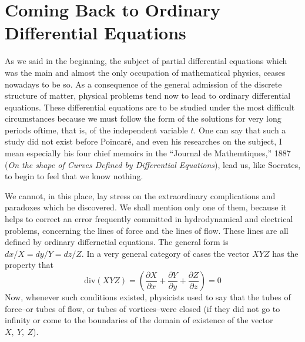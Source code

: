 \documentclass[12pt,oneside]{book}
\newcommand{\iit}[1]{\textit{#1}}
\begin{document}
\section{Coming Back to Ordinary Differential Equations}
As we said in the beginning, the subject of partial differential equations which was the main and almost the only occupation of mathematical physics, ceases nowadays to be so. As a consequence of the general admission of the discrete structure of matter, physical problems tend now to lead to ordinary differential equations. These differential equations are to be studied under the most difficult circumstances because we must follow the form of the solutions for very long periods oftime, that is, of the independent variable $t$. One can say that such a study did not exist before Poincar\'e, and even his researches on the subject, I mean especially his four chief memoirs in the ``Journal de Mathemtiques,'' 1887 (\iit{On the shape of Curves Defined by Differential Equations}), lead us, like Socrates, to begin to feel that we know nothing. \par 

We cannot, in this place, lay stress on the extraordinary complications and paradoxes which he discovered. We shall mention only one of them, because it helps to correct an error frequently committed in hydrodynamical and electrical problems, concerning the lines of force and the lines of flow. These lines are all defined by ordinary differnetial equations. The general form is $dx/X=dy/Y=dz/Z$. In a very general category of cases the vector $XYZ$ has the property that 
\begin{equation*}
    \text{div}(XYZ)=\left(\frac{\partial X}{\partial x}+\frac{\partial Y}{\partial y}+\frac{\partial Z}{\partial z}\right)=0
\end{equation*}
Now, whenever such conditions existed, physicists used to say that the tubes of force--or tubes of flow, or tubes of vortices--were closed (if they did not go to infinity or come to the boundaries of the domain of existence of the vector $X,\ Y,\ Z$). \par 
\end{document}
